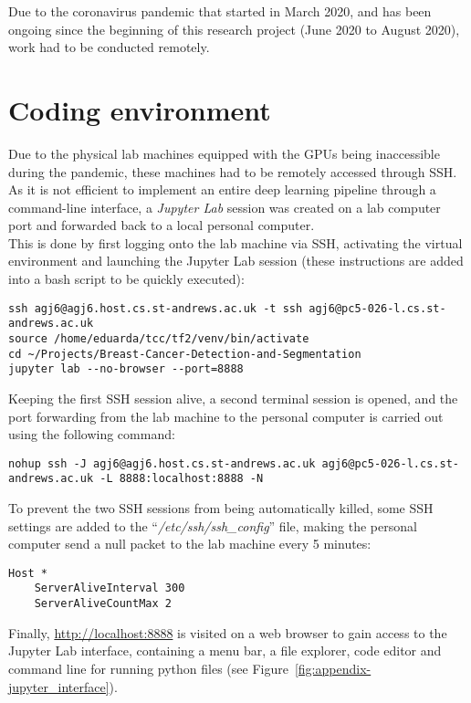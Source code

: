 Due to the coronavirus pandemic that started in March 2020, and has been ongoing since the beginning of this research project (June 2020 to August 2020), work had to be conducted remotely.

\section{Coding environment}

Due to the physical lab machines equipped with the GPUs being inaccessible during the pandemic, these machines had to be remotely accessed through SSH. As it is not efficient to implement an entire deep learning pipeline through a command-line interface, a \textit{Jupyter Lab} session was created on a lab computer port and forwarded back to a local personal computer.\\

This is done by first logging onto the lab machine via SSH, activating the virtual environment and launching the Jupyter Lab session (these instructions are added into a bash script to be quickly executed):

\begin{lstlisting}
ssh agj6@agj6.host.cs.st-andrews.ac.uk -t ssh agj6@pc5-026-l.cs.st-andrews.ac.uk
source /home/eduarda/tcc/tf2/venv/bin/activate
cd ~/Projects/Breast-Cancer-Detection-and-Segmentation
jupyter lab --no-browser --port=8888
\end{lstlisting}

Keeping the first SSH session alive, a second terminal session is opened, and the port forwarding from the lab machine  to the personal computer is carried out using  the following command:

\begin{lstlisting}
nohup ssh -J agj6@agj6.host.cs.st-andrews.ac.uk agj6@pc5-026-l.cs.st-andrews.ac.uk -L 8888:localhost:8888 -N
\end{lstlisting}

To prevent the two SSH sessions from being automatically killed, some SSH settings are added to the ``\textit{/etc/ssh/ssh\_config}'' file, making the personal computer send a null packet to the lab machine every 5 minutes:

\begin{lstlisting}
Host *
    ServerAliveInterval 300
    ServerAliveCountMax 2
\end{lstlisting}

Finally, \url{http://localhost:8888}  is visited on a web browser to gain access to  the Jupyter Lab interface, containing a menu bar, a file explorer, code editor and command line for running python files (see Figure~\ref{fig:appendix-jupyter_interface}).


